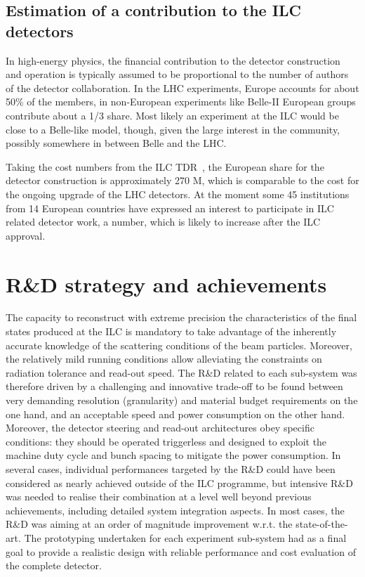\documentclass[%
 reprint,
 amsmath,amssymb,
 aps,
]{revtex4-1}
\begin{document}
\subsection{\label{Section:constructionmodel:ILCDet} Estimation of a
contribution to the ILC detectors}

In high-energy physics, the financial contribution to the detector
construction and operation
is typically assumed to be proportional to the number of authors of
the detector collaboration. In the LHC experiments, Europe accounts for about 50\% of the members, in non-European experiments like Belle-II European groups contribute about a 1/3 share. Most likely an experiment at the ILC would be close to a Belle-like model, though, given the large interest in the community, possibly somewhere in between Belle and the LHC. 

Taking
the cost numbers from
the ILC TDR~\cite{ILC-TDR}, the European share for the detector
construction is approximately 270 M\Euro{}, which is comparable to the cost for the ongoing upgrade of the LHC detectors. At the moment some 45 institutions from 14 European countries have expressed an interest to participate in ILC related detector work, a number, which is likely to increase after the ILC approval.

\section{\label{sec:RandD}R\&D strategy and achievements}

The capacity to reconstruct with extreme precision the characteristics of the ﬁnal states produced at the ILC is mandatory to take advantage of the inherently accurate knowledge of the scattering conditions of the beam particles. Moreover, the relatively mild running conditions allow alleviating the constraints on radiation tolerance and read-out speed. The R\&D related to each sub-system was therefore driven by a challenging and innovative trade-oﬀ to be found between very demanding resolution (granularity) and material budget requirements on the one hand, and an acceptable speed and power consumption on the other hand. Moreover, the detector steering and read-out architectures obey speciﬁc conditions: they should be operated triggerless and designed to exploit the machine duty cycle and bunch spacing to mitigate the power consumption.
In several cases, individual performances targeted by the R\&D could have been considered as nearly achieved outside of the ILC programme, but intensive R\&D was needed to realise their combination at a level well beyond previous achievements, including detailed system integration aspects. In most cases, the R\&D was aiming at an order of magnitude improvement w.r.t. the state-of-the-art. The prototyping undertaken for each experiment sub-system had as a ﬁnal goal to provide a realistic design with reliable performance and cost evaluation of the complete detector.
\end{document}

